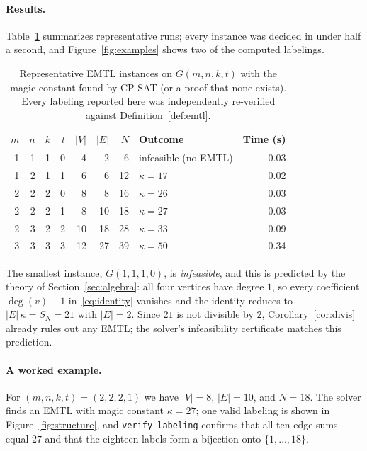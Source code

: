 \documentclass[11pt,a4paper]{article}
\theoremstyle{plain}
\theoremstyle{definition}
\theoremstyle{remark}
\newcommand{\km}{\kappa}
\newcommand{\Gfam}{G(m,n,k,t)}
\DeclareMathOperator{\degr}{deg}
\begin{document}
\paragraph{Results.}
Table~\ref{tab:results} summarizes representative runs; every instance was decided in
under half a second, and Figure~\ref{fig:examples} shows two of the computed labelings.

\begin{table}[t]
  \centering
  \small
  \begin{tabular}{@{}rrrrrrrlr@{}}
    \toprule
    $m$ & $n$ & $k$ & $t$ & $|V|$ & $|E|$ & $N$ & Outcome & Time (s) \\
    \midrule
    1 & 1 & 1 & 0 & 4  & 2  & 6  & infeasible (no EMTL) & 0.03 \\
    1 & 2 & 1 & 1 & 6  & 6  & 12 & $\km=17$ & 0.02 \\
    2 & 2 & 2 & 0 & 8  & 8  & 16 & $\km=26$ & 0.03 \\
    2 & 2 & 2 & 1 & 8  & 10 & 18 & $\km=27$ & 0.03 \\
    2 & 3 & 2 & 2 & 10 & 18 & 28 & $\km=33$ & 0.09 \\
    3 & 3 & 3 & 3 & 12 & 27 & 39 & $\km=50$ & 0.34 \\
    \bottomrule
  \end{tabular}
  \caption{Representative EMTL instances on $\Gfam$ with the magic constant found by
  CP-SAT (or a proof that none exists). Every labeling reported here was independently
  re-verified against Definition~\ref{def:emtl}.}
  \label{tab:results}
\end{table}

The smallest instance, $G(1,1,1,0)$, is \emph{infeasible}, and this is predicted by the
theory of Section~\ref{sec:algebra}: all four vertices have degree $1$, so every
coefficient $\degr(v)-1$ in~\eqref{eq:identity} vanishes and the identity reduces to
$|E|\,\km=S_N=21$ with $|E|=2$. Since $21$ is not divisible by $2$, Corollary~\ref{cor:divis}
already rules out any EMTL; the solver's infeasibility certificate matches this prediction.

\paragraph{A worked example.}
For $(m,n,k,t)=(2,2,2,1)$ we have $|V|=8$, $|E|=10$, and $N=18$.
The solver finds an EMTL with magic constant $\km=27$; one valid labeling is shown in
Figure~\ref{fig:structure}, and \texttt{verify\_labeling} confirms that all ten edge
sums equal $27$ and that the eighteen labels form a bijection onto $\{1,\dots,18\}$.
\end{document}

